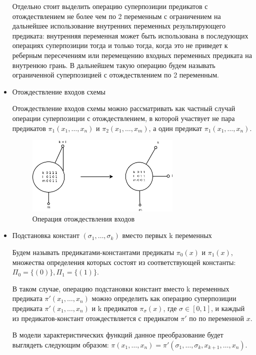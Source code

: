 \documentclass[12pt]{extarticle}
\begin{document}
\begin{itemize}
    Отдельно стоит выделить операцию суперпозиции предикатов с отождествлением не более чем по 2 переменным с
    ограничением на дальнейшее использование внутренних переменных результирующего предиката: внутренняя переменная
    может быть использована в последующих операциях суперпозиции тогда и только тогда, когда это не приведет
    к реберным пересечениям или перемещению входных переменных предиката на внутренюю грань. В дальнейшем такую операцию
    будем называть ограниченной суперпозицией с отождествлением по 2 переменным.
    
    \item Отождествление входов схемы
    
    Отождествление входов схемы можно рассматривать как частный случай операции суперпозиции с отождествлением, в 
    которой участвует не пара предикатов $\pi_1(x_1, \dots, x_n)$ и $\pi_2(x_1, \dots, x_m)$, а один предикат 
    $\pi_1(x_1, \dots, x_n)$.

    \begin{figure}[htb]
    \centering
    \includegraphics[width=0.7\textwidth]{join_ins_op.png}
    \caption{Операция отождествления входов}
    \label{fig:join_ins_op}
    \samepage
    \end{figure}

    \item Подстановка констант $(\sigma_1, \dots, \sigma_k)$ вместо первых k переменных

    Будем называть предикатами-константами предикаты $\pi_0(x)$ и $\pi_1(x)$, множества определения которых состоят
    из соответствующей константы: $\Pi_0=\{ (0) \}, \Pi_1=\{ (1) \}$.

    В таком случае, операцию подстановки констант вместо k переменных предиката $\pi'(x_1, \dots, x_n)$ 
    можно определить как операцию суперпозиции предиката $\pi'(x_1, \dots, x_n)$ и k предикатов 
    $\pi_{\sigma}(x)$, где $\sigma \in [0,1]$, и каждый из предикатов-констант отождествляется с предикатом $\pi'$ по
    по переменной $x$.

    В модели характеристических функций данное преобразование будет выглядеть следующим образом:
    $\pi(x_1, \dots, x_n) = \pi'(\sigma_1, \dots, \sigma_k, x_{k+1}, \dots, x_n)$. 
    

\end{itemize}
\end{document}
